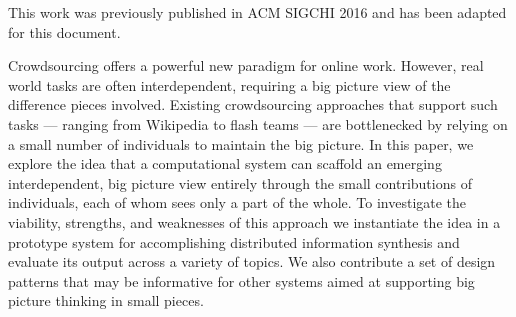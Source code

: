 
{\rmfamily
\vspace{-2em}
This work was previously published in ACM SIGCHI 2016 \cite{ka} and has been adapted for this document.
\vspace{2em}
}




Crowdsourcing offers a powerful new paradigm for online work. However, real world tasks are often interdependent, requiring a big picture view of the difference pieces involved. Existing crowdsourcing approaches that support such tasks --- ranging from Wikipedia to flash teams --- are bottlenecked by relying on a small number of individuals to maintain the big picture. In this paper, we explore the idea that a computational system can scaffold an emerging interdependent, big picture view entirely through the small contributions of individuals, each of whom sees only a part of the whole. To investigate the viability, strengths, and weaknesses of this approach we instantiate the idea in a prototype system for accomplishing distributed information synthesis and evaluate its output across a variety of topics.  We also contribute a set of design patterns that may be informative for other systems aimed at supporting big picture thinking in small pieces.\cite{ka}


